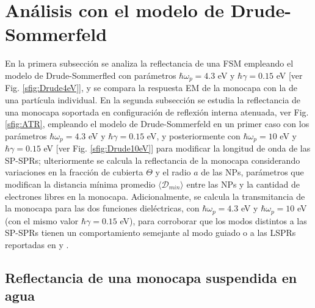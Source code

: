 \section{Análisis con el modelo de Drude-Sommerfeld}
\label{section:Drude}


 En la primera subsección se analiza la reflectancia de una FSM empleando el modelo de Drude-Sommerfled con parámetros $\hbar\omega_p = 4.3$ eV y  $\hbar\gamma = 0.15$ eV [ver Fig. \ref{sfig:Drude4eV}], y se compara la respuesta EM de la monocapa con la de una partícula individual. En la segunda subsección se estudia la reflectancia de una monocapa soportada en configuración de reflexión interna atenuada, ver Fig. \ref{sfig:ATR}, empleando el modelo de Drude-Sommerfeld en un primer caso con los parámetros  $\hbar\omega_p = 4.3$ eV y  $\hbar\gamma = 0.15$ eV, y posteriormente con $\hbar\omega_p = 10$ eV y $\hbar\gamma = 0.15$ eV [ver Fig. \ref{sfig:Drude10eV}] para modificar la longitud de onda de las SP-SPRs; ulteriormente se calcula la reflectancia de la monocapa considerando  variaciones en la fracción de cubierta $\Theta$ y el radio $a$ de las NPs, parámetros que modifican la distancia mínima promedio $\langle\mathscr{D}_{min}\rangle $ entre las NPs y la cantidad de electrones libres en la monocapa. Adicionalmente, se calcula la transmitancia de la monocapa para las dos funciones dieléctricas, con $\hbar\omega_p =4.3$ eV y $\hbar\omega_p =10$ eV (con el mismo valor $\hbar\gamma=0.15$ eV), para corroborar que los modos distintos a las SP-SPRs tienen un comportamiento semejante al modo guiado o a las LSPRs reportadas en \cite{kabashin2009plasmonic} y \cite{danilov2018ultra}. 
	
	\subsection{Reflectancia de una monocapa suspendida en agua}
	\label{ssection:DrudeFSM}
	
